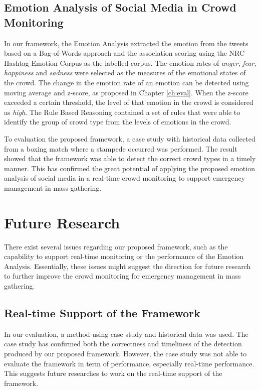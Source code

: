\subsection{Emotion Analysis of Social Media in Crowd Monitoring}
In our framework, the Emotion Analysis extracted the emotion from the tweets based on a Bag-of-Words approach and the association scoring using the NRC Hashtag Emotion Corpus \parencite{mohammad2014using} as the labelled corpus. The emotion rates of \textit{anger}, \textit{fear}, \textit{happiness} and \textit{sadness} were selected as the measures of the emotional states of the crowd. The change in the emotion rate of an emotion can be detected using moving average and z-score, as proposed in Chapter \ref{ch:eval}. When the z-score exceeded a certain threshold, the level of that emotion in the crowd is considered as \textit{high}. The Rule Based Reasoning contained a set of rules that were able to identify the group of crowd type from the levels of emotions in the crowd. 

To evaluation the proposed framework, a case study with historical data collected from a boxing match where a stampede occurred was performed. The result showed that the framework was able to detect the correct crowd types in a timely manner. This has confirmed the great potential of applying the proposed emotion analysis of social media in a real-time crowd monitoring to support emergency management in mass gathering.

\section{Future Research}
There exist several issues regarding our proposed framework, such as the capability to support real-time monitoring or the performance of the Emotion Analysis. Essentially, these issues might suggest the direction for future research to further improve the crowd monitoring for emergency management in mass gathering.

\subsection{Real-time Support of the Framework}
In our evaluation, a method using case study and historical data was used. The case study has confirmed both the correctness and timeliness of the detection produced by our proposed framework. However, the case study was not able to evaluate the framework in term of performance, especially real-time performance. This suggests future researches to work on the real-time support of the framework.

